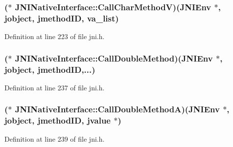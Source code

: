 \hypertarget{struct_j_n_i_native_interface_a3ca31ced99d0bc6241d94db6657e45e2}{
\subsubsection[{Call\-Char\-Method\-V}]{($\ast$ J\-N\-I\-Native\-Interface\-::\-Call\-Char\-Method\-V)({\bf J\-N\-I\-Env} $\ast$, {\bf jobject}, {\bf jmethod\-I\-D}, va\-\_\-list)}}\label{struct_j_n_i_native_interface_a3ca31ced99d0bc6241d94db6657e45e2}


Definition at line 223 of file jni.\-h.

\hypertarget{struct_j_n_i_native_interface_a121c60a667e56043bb2b0cf5834f5571}{
\subsubsection[{Call\-Double\-Method}]{($\ast$ J\-N\-I\-Native\-Interface\-::\-Call\-Double\-Method)({\bf J\-N\-I\-Env} $\ast$, {\bf jobject}, {\bf jmethod\-I\-D},...)}}\label{struct_j_n_i_native_interface_a121c60a667e56043bb2b0cf5834f5571}


Definition at line 237 of file jni.\-h.

\hypertarget{struct_j_n_i_native_interface_a22ebdb2afb889f76ce7c0e012f4f9c2b}{
\subsubsection[{Call\-Double\-Method\-A}]{($\ast$ J\-N\-I\-Native\-Interface\-::\-Call\-Double\-Method\-A)({\bf J\-N\-I\-Env} $\ast$, {\bf jobject}, {\bf jmethod\-I\-D}, {\bf jvalue} $\ast$)}}\label{struct_j_n_i_native_interface_a22ebdb2afb889f76ce7c0e012f4f9c2b}


Definition at line 239 of file jni.\-h.

